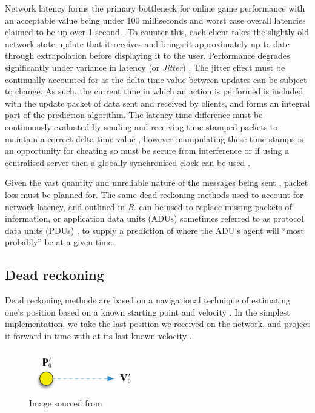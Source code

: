 \documentclass[journal]{IEEEtran}
\begin{document}
Network latency forms the primary bottleneck for online game performance with an acceptable value being under 100 milliseconds \cite{lee2015outatime} \cite{smed2002aspects} and worst case overall latencies claimed to be up over 1 second \cite{claypool2006latency}. To counter this, each client takes the slightly old network state update that it receives and brings it approximately up to date through extrapolation before displaying it to the user. Performance degrades significantly under variance in latency (or \textit{Jitter}) \cite{beigbeder2004effects} \cite{dick2005analysis}. The jitter effect must be continually accounted for as the delta time value between updates can be subject to change. As such, the current time in which an action is performed is included with the update packet of data sent and received by clients, and forms an integral part of the prediction algorithm. The latency time difference must be continuously evaluated by sending and receiving time stamped packets to maintain a correct delta time value \cite{glazer2015multiplayer}, however manipulating these time stamps is an opportunity for cheating \cite{jamin2003cheat} so must be secure from interference or if using a centralised server then a globally synchronised clock can be used \cite{aggarwal2004accuracy}.

Given the vast quantity and unreliable nature of the messages being sent \cite{cronin2001distributed}, packet loss must be planned for. The same dead reckoning methods used to account for network latency, and outlined in \textit{B.} can be used to replace missing packets of information, or application data units (ADUs) \cite{diot1999distributed} sometimes referred to as protocol data units (PDUs) \cite{dis1998ieee}, to supply a prediction of where the ADU's agent will ``most probably'' be at a given time.

\subsection{Dead reckoning}

Dead reckoning methods are based on a navigational technique of estimating one’s position based on a known starting point and velocity \cite{smed2002aspects}. In the simplest implementation, we take the last position we received on the network, and project it forward in time with at its last known velocity \cite{murphy2011believable}.

\begin{figure}[h]
    \centering
    \includegraphics[width=0.5\linewidth]{DR1.png}
    \caption{Image sourced from \cite{murphy2011believable}}
    \label{fig:dr1}
\end{figure}
\end{document}
